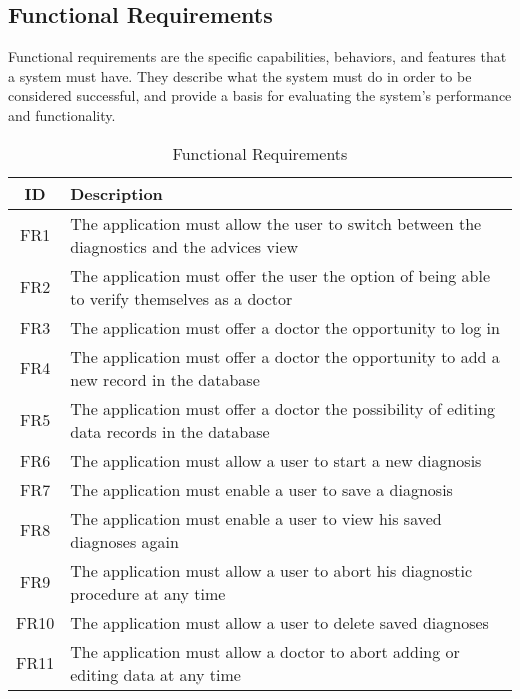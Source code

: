 \subsection{Functional Requirements}
Functional requirements are the specific capabilities, behaviors, and features that a system must have. They describe what the system must do in order to be considered successful, and provide a basis for evaluating the system's performance and functionality.
\begin{table}[H]
	\begin{center}
		\scriptsize
		\def\arraystretch{2}%
		\begin{tabular}{ c|l}
			\hline
			\textbf{ID} & \textbf{Description}  \\
			\hline
			FR1 & The application must allow the user to switch between the diagnostics and the advices view  \\
			\hline
			FR2 & The application must offer the user the option of being able to verify themselves as a doctor  \\
			\hline
			FR3 & The application must offer a doctor the opportunity to log in  \\
			\hline
			FR4 & The application must offer a doctor the opportunity to add a new record in the database  \\
			\hline
			FR5 & The application must offer a doctor the possibility of editing data records in the database  \\
			\hline
			FR6 & The application must allow a user to start a new diagnosis  \\
			\hline
			FR7 & The application must enable a user to save a diagnosis  \\
			\hline	
			FR8 & The application must enable a user to view his saved diagnoses again  \\
			\hline
			FR9& The application must allow a user to abort his diagnostic procedure at any time \\
			\hline
			FR10 & The application must allow a user to delete saved diagnoses  \\
			\hline
			FR11 & The application must allow a doctor to abort adding or editing data at any time\\
			\hline
		\end{tabular}
		\normalsize
	\end{center}
	\caption{Functional Requirements}
\end{table}


